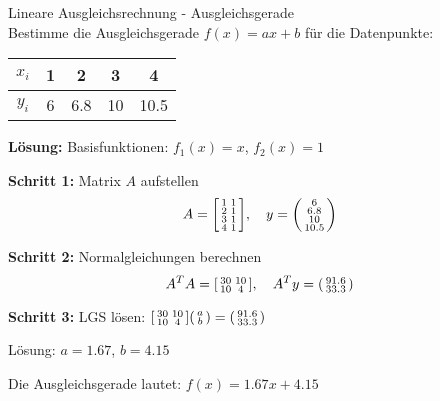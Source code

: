 \begin{example2}{Lineare Ausgleichsrechnung - Ausgleichsgerade}\\
Bestimme die Ausgleichsgerade $f(x) = ax + b$ für die Datenpunkte:
\begin{center}
\begin{tabular}{|c|c|c|c|c|}
\hline
$x_i$ & 1 & 2 & 3 & 4 \\
\hline
$y_i$ & 6 & 6.8 & 10 & 10.5 \\
\hline
\end{tabular}
\end{center}
\tcblower
\textbf{Lösung:}
Basisfunktionen: $f_1(x) = x$, $f_2(x) = 1$

\textbf{Schritt 1:} Matrix $A$ aufstellen
$$A = \begin{bsmallmatrix} 1 & 1 \\ 2 & 1 \\ 3 & 1 \\ 4 & 1 \end{bsmallmatrix}, \quad y = \begin{psmallmatrix} 6 \\ 6.8 \\ 10 \\ 10.5 \end{psmallmatrix}$$

\textbf{Schritt 2:} Normalgleichungen berechnen
$$A^T A = \begin{bsmallmatrix} 30 & 10 \\ 10 & 4 \end{bsmallmatrix}, \quad A^T y = \begin{psmallmatrix} 91.6 \\ 33.3 \end{psmallmatrix}$$

\textbf{Schritt 3:} LGS lösen:
$\begin{bsmallmatrix} 30 & 10 \\ 10 & 4 \end{bsmallmatrix} \begin{psmallmatrix} a \\ b \end{psmallmatrix} = \begin{psmallmatrix} 91.6 \\ 33.3 \end{psmallmatrix}$

Lösung: $a = 1.67$, $b = 4.15$

Die Ausgleichsgerade lautet: $f(x) = 1.67x + 4.15$
\end{example2}

